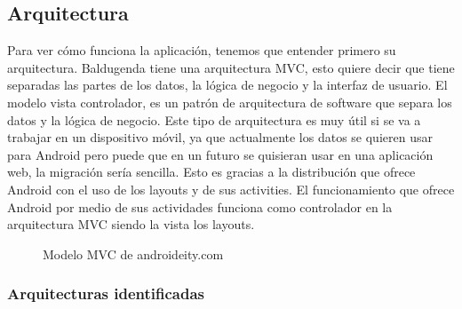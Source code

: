 \subsection{Arquitectura}
\label{subsecc:arquitectura}

Para ver cómo funciona la aplicación, tenemos que entender primero su arquitectura. Baldugenda tiene una arquitectura MVC, esto quiere decir que tiene separadas las partes de los datos, la lógica de negocio y la interfaz de usuario.
El modelo vista controlador, es un patrón de arquitectura de software que separa los datos y la lógica de negocio. Este tipo de arquitectura es muy útil si se va a trabajar en un dispositivo móvil, ya que actualmente los datos se quieren usar para Android pero puede que en un futuro se quisieran usar en una aplicación web, la migración sería sencilla. Esto es gracias a la distribución que ofrece Android con el uso de los layouts y de sus activities.
El funcionamiento que ofrece Android por medio de sus actividades funciona como controlador en la arquitectura MVC siendo la vista los layouts.



\begin{figure}[H] 
  \begin{center} 
    \caption{Modelo MVC de androideity.com} 
    \label{fig:ModeloMVC} 
  \end{center} 
\end{figure}


\subsubsection{Arquitecturas identificadas}
\label{subsubsecc:Arquitecturas identificadas}

